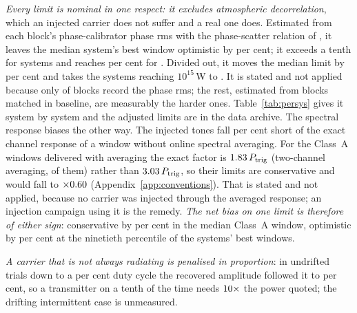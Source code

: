 \emph{Every limit is nominal in one respect: it excludes atmospheric
decorrelation}, which an injected carrier does not suffer and a real one does.
Estimated from each block's phase-calibrator phase rms
\citep[\S\S10.4.11, 11.3.1]{ALMAHandbook} with the phase-scatter relation of
\citet[Eq.~3]{Richards2022}, it leaves the median system's best window optimistic by \NmDecSysMedPct{} per
cent; it exceeds a tenth for \NmDecNBigSys{} systems and reaches
\NmDecSysWorstPct{} per cent for \NmDecSysWorstName. Divided out, it moves the median limit by
\NmDecAdjShiftPct{} per cent and takes the \NSysEfifteen{} systems reaching
$10^{15}$\,W to \NmDecAdjNEfifteen. It is stated and not applied because only \SensDecorNBlk{} of
\SensDecorNBlkTot{} blocks record the phase rms; the rest, estimated from
blocks matched in baseline, are measurably the harder ones.
Table~\ref{tab:persys} gives it system by system and the adjusted limits are
in the data archive. The spectral response biases the other way. The
injected tones fall \InjShortPct{} per cent short of the exact channel response
of a window without online spectral averaging. For the \SvNWinNAvg{}
Class~A windows delivered with averaging the exact factor is
$1.83\,P_{\rm trig}$ (two-channel averaging, \SvNWinNTwo{} of them)
rather than $3.03\,P_{\rm trig}$, so their limits are conservative
and would fall to $\times0.60$ (Appendix~\ref{app:conventions}).
That is stated and not applied, because no carrier was injected through the
averaged response; an injection campaign using it is the remedy. \emph{The net
bias on one limit is therefore of either sign}: conservative by
\SvNetConsPct{} per cent in the median Class~A window, optimistic by
\SvNetOptPct{} per cent at the ninetieth percentile of the systems' best
windows.

\emph{A carrier that is not always radiating is penalised in proportion}: in
\DutyNTrial{} undrifted trials down to a \DutyCycleMinPct{} per cent duty cycle
the recovered amplitude followed it to \DutyAttenDevPct{} per cent, so a
transmitter on a tenth of the time needs $10\times$ the power quoted;
the drifting intermittent case is unmeasured.

\begin{table}
\centering
\scriptsize
\caption{What sets $\mathrm{EIRP}_{90}$, and in which direction. The
calibration interval applies to the class-average factor and so to any
statistic over many windows; the spread between windows is an observed
dispersion and is the statement about one window; the signed terms are biases
and are not folded into an error bar (\S\ref{sec:pninetysel}).}
\label{tab:p90budget}
\setlength{\tabcolsep}{2pt}

\end{table}

